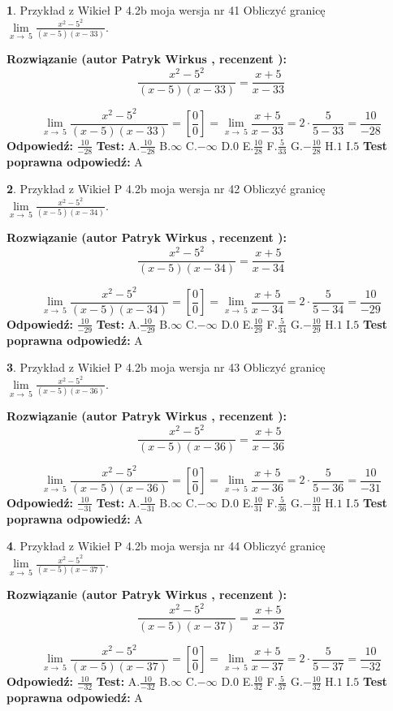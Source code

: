 \documentclass[12pt, a4paper]{article}
\theoremstyle{definition} %
\newtheorem{zad}{}
\newcommand{\zadStart}[1]{\begin{zad}#1\newline}
\newcommand{\zadStop}{\end{zad}}
\newcommand{\rozwStart}[2]{\noindent \textbf{Rozwiązanie (autor #1 , recenzent #2): }\newline}
\newcommand{\rozwStop}{\newline}
\newcommand{\odpStart}{\noindent \textbf{Odpowiedź:}\newline}
\newcommand{\odpStop}{\newline}
\newcommand{\testStart}{\noindent \textbf{Test:}\newline}
\newcommand{\testStop}{\newline}
\newcommand{\kluczStart}{\noindent \textbf{Test poprawna odpowiedź:}\newline}
\newcommand{\kluczStop}{\newline}
\begin{document}
\zadStart{Przykład z Wikieł P 4.2b moja wersja nr 41}
Obliczyć granicę $\lim\limits_{x\to\ 5}\frac{x^{2}-5^{2}}{(x-5)(x-33)}$.
\zadStop
\rozwStart{Patryk Wirkus}{}
$$\frac{x^{2}-5^{2}}{(x-5)(x-33)}=\frac{x+5}{x-33}$$

$$\lim\limits_{x\to\ 5}\frac{x^{2}-5^{2}}{(x-5)(x-33)}=[\frac{0}{0}]=\lim\limits_{x\to\ 5}\frac{x+5}{x-33}=2 \cdot \frac{5}{5-33} = \frac{10}{-28}$$
\rozwStop
\odpStart
$\frac{10}{-28}$
\odpStop
\testStart
A.$\frac{10}{-28}$
B.$\infty$
C.$-\infty$
D.$0$
E.$\frac{10}{28}$
F.$\frac{5}{33}$
G.$-\frac{10}{28}$
H.$1$
I.$5$
\testStop
\kluczStart
A
\kluczStop



\zadStart{Przykład z Wikieł P 4.2b moja wersja nr 42}
Obliczyć granicę $\lim\limits_{x\to\ 5}\frac{x^{2}-5^{2}}{(x-5)(x-34)}$.
\zadStop
\rozwStart{Patryk Wirkus}{}
$$\frac{x^{2}-5^{2}}{(x-5)(x-34)}=\frac{x+5}{x-34}$$

$$\lim\limits_{x\to\ 5}\frac{x^{2}-5^{2}}{(x-5)(x-34)}=[\frac{0}{0}]=\lim\limits_{x\to\ 5}\frac{x+5}{x-34}=2 \cdot \frac{5}{5-34} = \frac{10}{-29}$$
\rozwStop
\odpStart
$\frac{10}{-29}$
\odpStop
\testStart
A.$\frac{10}{-29}$
B.$\infty$
C.$-\infty$
D.$0$
E.$\frac{10}{29}$
F.$\frac{5}{34}$
G.$-\frac{10}{29}$
H.$1$
I.$5$
\testStop
\kluczStart
A
\kluczStop



\zadStart{Przykład z Wikieł P 4.2b moja wersja nr 43}
Obliczyć granicę $\lim\limits_{x\to\ 5}\frac{x^{2}-5^{2}}{(x-5)(x-36)}$.
\zadStop
\rozwStart{Patryk Wirkus}{}
$$\frac{x^{2}-5^{2}}{(x-5)(x-36)}=\frac{x+5}{x-36}$$

$$\lim\limits_{x\to\ 5}\frac{x^{2}-5^{2}}{(x-5)(x-36)}=[\frac{0}{0}]=\lim\limits_{x\to\ 5}\frac{x+5}{x-36}=2 \cdot \frac{5}{5-36} = \frac{10}{-31}$$
\rozwStop
\odpStart
$\frac{10}{-31}$
\odpStop
\testStart
A.$\frac{10}{-31}$
B.$\infty$
C.$-\infty$
D.$0$
E.$\frac{10}{31}$
F.$\frac{5}{36}$
G.$-\frac{10}{31}$
H.$1$
I.$5$
\testStop
\kluczStart
A
\kluczStop



\zadStart{Przykład z Wikieł P 4.2b moja wersja nr 44}
Obliczyć granicę $\lim\limits_{x\to\ 5}\frac{x^{2}-5^{2}}{(x-5)(x-37)}$.
\zadStop
\rozwStart{Patryk Wirkus}{}
$$\frac{x^{2}-5^{2}}{(x-5)(x-37)}=\frac{x+5}{x-37}$$

$$\lim\limits_{x\to\ 5}\frac{x^{2}-5^{2}}{(x-5)(x-37)}=[\frac{0}{0}]=\lim\limits_{x\to\ 5}\frac{x+5}{x-37}=2 \cdot \frac{5}{5-37} = \frac{10}{-32}$$
\rozwStop
\odpStart
$\frac{10}{-32}$
\odpStop
\testStart
A.$\frac{10}{-32}$
B.$\infty$
C.$-\infty$
D.$0$
E.$\frac{10}{32}$
F.$\frac{5}{37}$
G.$-\frac{10}{32}$
H.$1$
I.$5$
\testStop
\kluczStart
A
\kluczStop
\end{document}
